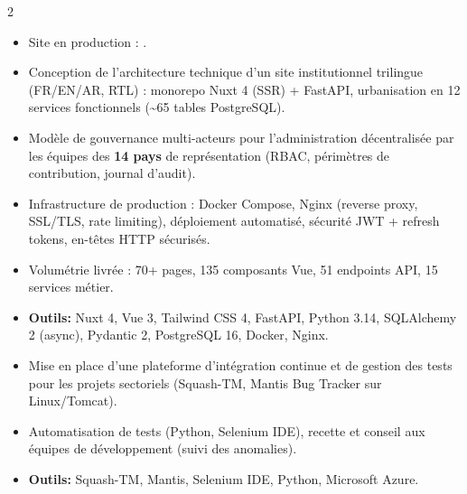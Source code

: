 \documentclass[10pt,a4paper,ragged2e,withhyper]{altacv}
\begin{document}
\begin{paracol}{2}
            \begin{itemize}
                \item Site en production : .
                \item Conception de l'architecture technique d'un site institutionnel trilingue (FR/EN/AR, RTL) : monorepo Nuxt 4 (SSR) + FastAPI, urbanisation en 12 services fonctionnels (\textasciitilde65 tables PostgreSQL).
                \item Modèle de gouvernance multi-acteurs pour l'administration décentralisée par les équipes des \textbf{14 pays} de représentation (RBAC, périmètres de contribution, journal d'audit).
                \item Infrastructure de production : Docker Compose, Nginx (reverse proxy, SSL/TLS, rate limiting), déploiement automatisé, sécurité JWT + refresh tokens, en-têtes HTTP sécurisés.
                \item Volumétrie livrée : 70+ pages, 135 composants Vue, 51 endpoints API, 15 services métier.
                \item \textcolor{SecondaryColor}{\textbf{Outils: }} Nuxt 4, Vue 3, Tailwind CSS 4, FastAPI, Python 3.14, SQLAlchemy 2 (async), Pydantic 2, PostgreSQL 16, Docker, Nginx.
            \end{itemize}
            \divider

            \newpage

            \begin{itemize}
                \item Mise en place d'une plateforme d'intégration continue et de gestion des tests pour les projets sectoriels (Squash-TM, Mantis Bug Tracker sur Linux/Tomcat).
                \item Automatisation de tests (Python, Selenium IDE), recette et conseil aux équipes de développement (suivi des anomalies).
                \item \textcolor{SecondaryColor}{\textbf{Outils: }} Squash-TM, Mantis, Selenium IDE, Python, Microsoft Azure.
            \end{itemize}
            \divider


\end{paracol}
\end{document}
